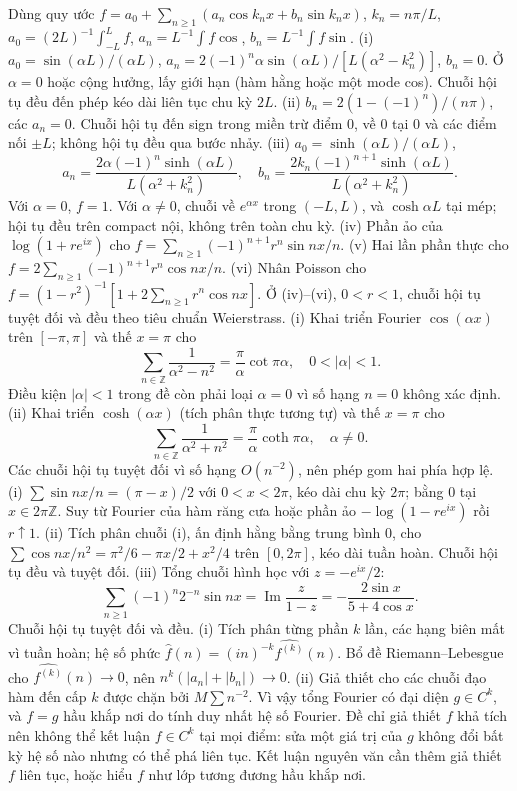 Dùng quy ước $f=a_0+\sum_{n\ge1}(a_n\cos k_nx+b_n\sin k_nx)$, $k_n=n\pi/L$, $a_0=(2L)^{-1}\int_{-L}^Lf$, $a_n=L^{-1}\int f\cos$, $b_n=L^{-1}\int f\sin$.
(i) $a_0=\sin(\alpha L)/(\alpha L)$, $a_n=2(-1)^n\alpha\sin(\alpha L)/[L(\alpha^2-k_n^2)]$, $b_n=0$. Ở $\alpha=0$ hoặc cộng hưởng, lấy giới hạn (hàm hằng hoặc một mode cos). Chuỗi hội tụ đều đến phép kéo dài liên tục chu kỳ $2L$.
(ii) $b_n=2(1-(-1)^n)/(n\pi)$, các $a_n=0$. Chuỗi hội tụ đến sign trong miền trừ điểm 0, về 0 tại 0 và các điểm nối $\pm L$; không hội tụ đều qua bước nhảy.
(iii) $a_0=\sinh(\alpha L)/(\alpha L)$,
\[a_n=\frac{2\alpha(-1)^n\sinh(\alpha L)}{L(\alpha^2+k_n^2)},\quad b_n=\frac{2k_n(-1)^{n+1}\sinh(\alpha L)}{L(\alpha^2+k_n^2)}.\]
Với $\alpha=0$, $f=1$. Với $\alpha\ne0$, chuỗi về $e^{\alpha x}$ trong $(-L,L)$, và $\cosh\alpha L$ tại mép; hội tụ đều trên compact nội, không trên toàn chu kỳ.
(iv) Phần ảo của $\log(1+re^{ix})$ cho $f=\sum_{n\ge1}(-1)^{n+1}r^n\sin nx/n$.
(v) Hai lần phần thực cho $f=2\sum_{n\ge1}(-1)^{n+1}r^n\cos nx/n$.
(vi) Nhân Poisson cho $f=(1-r^2)^{-1}[1+2\sum_{n\ge1}r^n\cos nx]$. Ở (iv)--(vi), $0<r<1$, chuỗi hội tụ tuyệt đối và đều theo tiêu chuẩn Weierstrass.
(i) Khai triển Fourier $\cos(\alpha x)$ trên $[-\pi,\pi]$ và thế $x=\pi$ cho
\[\sum_{n\in\mathbb Z}\frac1{\alpha^2-n^2}=\frac\pi\alpha\cot\pi\alpha,\quad0<|\alpha|<1.\]
Điều kiện $|\alpha|<1$ trong đề còn phải loại $\alpha=0$ vì số hạng $n=0$ không xác định.
(ii) Khai triển $\cosh(\alpha x)$ (tích phân thực tương tự) và thế $x=\pi$ cho
\[\sum_{n\in\mathbb Z}\frac1{\alpha^2+n^2}=\frac\pi\alpha\coth\pi\alpha,\quad\alpha\ne0.\]
Các chuỗi hội tụ tuyệt đối vì số hạng $O(n^{-2})$, nên phép gom hai phía hợp lệ.
(i) $\sum\sin nx/n=(\pi-x)/2$ với $0<x<2\pi$, kéo dài chu kỳ $2\pi$; bằng 0 tại $x\in2\pi\mathbb Z$. Suy từ Fourier của hàm răng cưa hoặc phần ảo $-\log(1-re^{ix})$ rồi $r\uparrow1$.
(ii) Tích phân chuỗi (i), ấn định hằng bằng trung bình 0, cho $\sum\cos nx/n^2=\pi^2/6-\pi x/2+x^2/4$ trên $[0,2\pi]$, kéo dài tuần hoàn. Chuỗi hội tụ đều và tuyệt đối.
(iii) Tổng chuỗi hình học với $z=-e^{ix}/2$:
\[\sum_{n\ge1}(-1)^n2^{-n}\sin nx=\operatorname{Im}\frac z{1-z}=-\frac{2\sin x}{5+4\cos x}.\]
Chuỗi hội tụ tuyệt đối và đều.
(i) Tích phân từng phần $k$ lần, các hạng biên mất vì tuần hoàn; hệ số phức $\widehat f(n)=(in)^{-k}\widehat{f^{(k)}}(n)$. Bổ đề Riemann--Lebesgue cho $\widehat{f^{(k)}}(n)\to0$, nên $n^k(|a_n|+|b_n|)\to0$.
(ii) Giả thiết cho các chuỗi đạo hàm đến cấp $k$ được chặn bởi $M\sum n^{-2}$. Vì vậy tổng Fourier có đại diện $g\in C^k$, và $f=g$ hầu khắp nơi do tính duy nhất hệ số Fourier. Đề chỉ giả thiết $f$ khả tích nên không thể kết luận $f\in C^k$ tại mọi điểm: sửa một giá trị của $g$ không đổi bất kỳ hệ số nào nhưng có thể phá liên tục. Kết luận nguyên văn cần thêm giả thiết $f$ liên tục, hoặc hiểu $f$ như lớp tương đương hầu khắp nơi.
